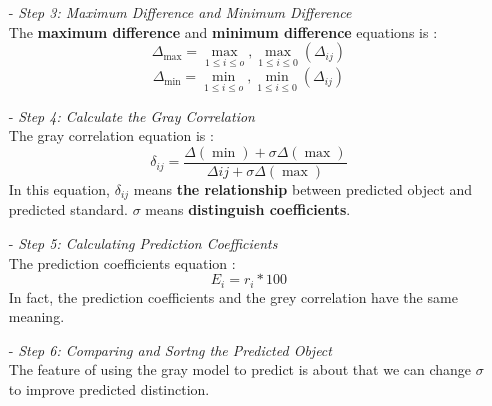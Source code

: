 \documentclass{mcmthesis}
\begin{document}
\begin{itemize}
\begin{itemize}
	    \item [-] \textit{Step 3: Maximum Difference and Minimum Difference} \\   %
	    The \textbf{maximum difference} and \textbf{minimum difference} equations is : \\
	    \begin{equation}
	    	{\Delta _{\max }} = \mathop {\max }\limits_{1 \le i \le o} ,\mathop {\max }\limits_{1 \le i \le 0} ({\Delta _{ij}})
	        \end{equation}
	     \begin{equation}
	    	{\Delta _{\min }}= \mathop {\min }\limits_{1 \le i \le o} ,\mathop {\min }\limits_{1 \le i \le 0} ({\Delta _{ij}})
	    \end{equation}
	    
	    \item [-] \textit{Step 4: Calculate the Gray Correlation} \\    %
	    The gray correlation equation is :\\
	    \begin{equation}
	    {\delta _{ij}} = \frac{{\Delta (\min ) + \sigma \Delta (\max )}}{{\Delta ij + \sigma \Delta (\max )}}
	    \end{equation}
	    In this equation, ${\delta _{ij}}$ means \textbf{the relationship} between predicted object and predicted standard. $\sigma $ means \textbf{distinguish coefficients}.\\%
	    
	    \item [-] \textit{Step 5: Calculating Prediction Coefficients
	    } \\ %
	    The prediction coefficients equation :\\
	    \begin{equation}
	    {E_i} = {r_i}*100
	    \end{equation}
	    In fact, the prediction coefficients and the grey correlation have the same meaning. \\
	    \item [-] \textit{Step 6: Comparing and Sortng the Predicted Object} \\ %
	    The feature of using the gray model to predict is about that we can change $\sigma$ to improve predicted distinction.
	\end{itemize}  
\end{itemize}
\end{document}
